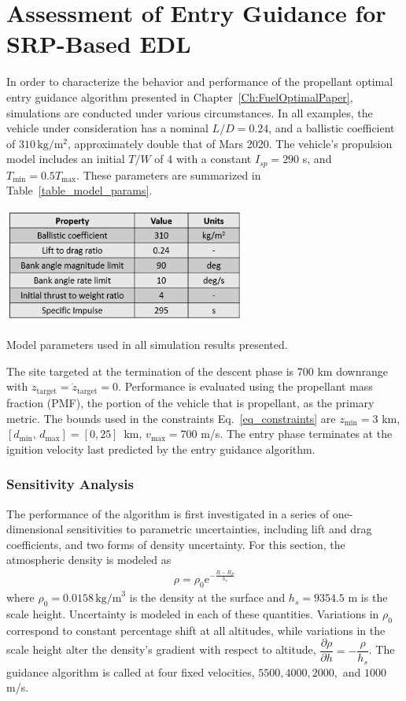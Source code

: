 \chapter{Assessment of Entry Guidance for SRP-Based EDL}\label{Ch:FuelOptimalAssessment}
In order to characterize the behavior and performance of the propellant optimal entry guidance algorithm presented in Chapter~\ref{Ch:FuelOptimalPaper}, simulations are conducted under various circumstances. In all examples, the vehicle under consideration has a nominal $L/D=0.24$, and a ballistic coefficient of $310\, \mathrm{kg/m^2}$, approximately double that of Mars 2020. The vehicle's propulsion model includes an initial $ T/W $ of 4 with a constant $ I_{sp} = 290$ s, and $T_{\min}=0.5T_{\max}$. These parameters are summarized in Table~\ref{table_model_params}.
\begin{table}[h!]
	\centering
	\includegraphics[width=0.6\textwidth]{../AAS20/ParamTable} 
	\caption{Model parameters used in all simulation results presented.}
	\label{table_model_params}
\end{table}
The site targeted at the termination of the descent phase is 700 km downrange with $z_{\mathrm{target}}=\dot{z}_{\mathrm{target}}=0$. 
Performance is evaluated using the propellant mass fraction (PMF), the portion of the vehicle that is propellant, as the primary metric. The bounds used in the constraints Eq.~\ref{eq_constraints} are $z_{\min} = 3$ km, $[d_{\min},\,d_{\max}] = [0, 25]\,$ km, $v_{\max} = 700 $ m/s. The entry phase terminates at the ignition velocity last predicted by the entry guidance algorithm.

\subsection{Sensitivity Analysis}
The performance of the algorithm is first investigated in a series of one-dimensional sensitivities to parametric uncertainties, including lift and drag coefficients, and two forms of density uncertainty. For this section, the atmospheric density is modeled as 
\begin{align}
\rho = \rho_0\mathrm{e}^{-\frac{R-R_P}{h_s}}
\end{align}
where $\rho_0 = 0.0158 \,\mathrm{kg/m}^3$ is the density at the surface and $h_s = 9354.5$ m is the scale height. Uncertainty is modeled in each of these quantities. Variations in $\rho_0$ correspond to constant percentage shift at all altitudes, while variations in the scale height alter the density's gradient with respect to altitude, $\dfrac{\partial\rho}{\partial h} = -\dfrac{\rho}{h_s}$. The guidance algorithm is called at four fixed velocities, $5500, 4000, 2000,$ and $1000$ m/s.

